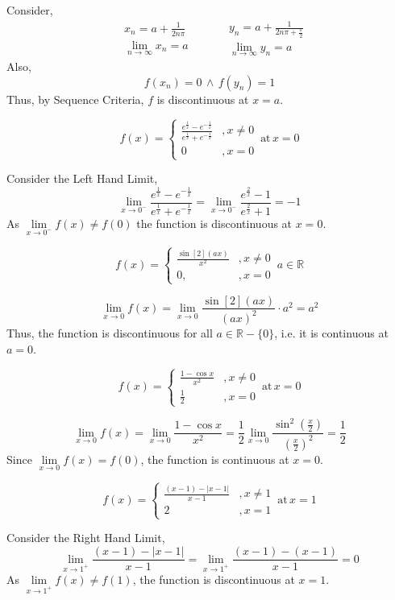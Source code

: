 \begin{anse}
	Consider,
	\[
	\begin{split}
		&x_n=a+\frac{1}{2n\pi}\\
		&\lim\limits_{n\to \infty}x_n=a
	\end{split}
	\quad  \quad
	\begin{split}
		&y_n=a+\frac{1}{2n\pi+\frac{\pi}{2}}\\
		&\lim\limits_{n\to\infty}y_n=a
	\end{split}
	\]
	Also,
	\[f(x_n)=0\,\land\, f(y_n)=1\]
	Thus, by Sequence Criteria, $f$ is discontinuous at $x=a$.
\end{anse}
\begin{asign}
	\[f(x)=\begin{cases}
		\frac{e^{\frac{1}{x}}-e^{-\frac{1}{x}}}{e^{\frac{1}{x}}+e^{-\frac{1}{x}}} &, x\neq 0\\
		0 &, x=0
	\end{cases} \, \text{at}\, x=0\]
\end{asign}
\begin{anse}
	Consider the Left Hand Limit,
	\[\lim\limits_{x\to0^-}\frac{e^{\frac{1}{x}}-e^{-\frac{1}{x}}}{e^{\frac{1}{x}}+e^{-\frac{1}{x}}}=\lim\limits_{x\to0^-}\frac{e^{\frac{2}{x}}-1}{e^{\frac{2}{x}}+1}=-1\]
	As $\lim\limits_{x\to0^-}f(x)\neq f(0)$ the function is discontinuous at $x=0$.
\end{anse}
\begin{asign}
	\[f(x)=\begin{cases}
		\frac{\sin[2](ax)}{x^2} &, x\neq 0\\
		0, &, x=0
	\end{cases} \, a\in \mathbb{R}\]
\end{asign}
\begin{anse}
	\[\lim\limits_{x\to 0}f(x)=\lim\limits_{x\to0}\frac{\sin[2](ax)}{(ax)^2}\cdot a^2=a^2\]
	Thus, the function is discontinuous for all $a\in\mathbb{R}-\{0\}$, i.e. it is continuous at $a=0$.
\end{anse}
\begin{asign}
	\[f(x)=\begin{cases}
		\frac{1-\cos x}{x^2} &, x\neq0\\
		\frac{1}{2} &, x=0
	\end{cases} \, \text{at} \, x=0\]
\end{asign}
\begin{anse}
	\[\lim\limits_{x\to0}f(x)=\lim\limits_{x\to0} \frac{1-\cos x}{x^2}=\frac{1}{2}\lim\limits_{x\to0}\frac{\sin^2(\frac{x}{2})}{(\frac{x}{2})^2}=\frac{1}{2}\]
	Since $\lim\limits_{x\to0}f(x)=f(0)$, the function is continuous at $x=0$.
\end{anse}
\begin{asign}
	\[f(x)=\begin{cases}
		\frac{(x-1)-|x-1|}{x-1} &, x\neq 1\\
		2 &, x=1
	\end{cases} \, \text{at}\, x=1\]
\end{asign}
\begin{anse}
	Consider the Right Hand Limit,
	\[\lim\limits_{x\to 1^+}\frac{(x-1)-|x-1|}{x-1} =\lim\limits_{x\to1^+}\frac{(x-1)-(x-1)}{x-1}=0\]
	As $\lim\limits_{x\to1^+}f(x)\neq f(1)$, the function is discontinuous at $x=1$.
\end{anse}
